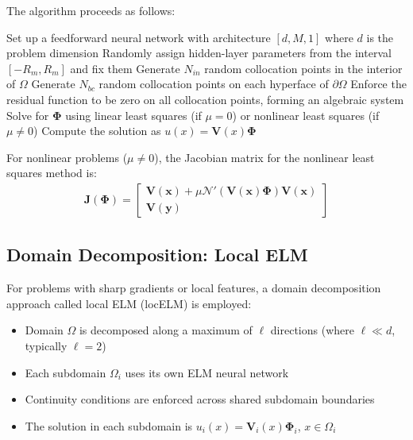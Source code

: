 \documentclass[11pt]{article}
\begin{document}
The algorithm proceeds as follows:

\begin{algorithm}
\caption{ELM Method for High-Dimensional PDEs}
\begin{algorithmic}[1]
\State Set up a feedforward neural network with architecture $[d, M, 1]$ where $d$ is the problem dimension
\State Randomly assign hidden-layer parameters from the interval $[-R_m, R_m]$ and fix them
\State Generate $N_{in}$ random collocation points in the interior of $\Omega$
\State Generate $N_{bc}$ random collocation points on each hyperface of $\partial\Omega$
\State Enforce the residual function to be zero on all collocation points, forming an algebraic system
\State Solve for $\mathbf{\Phi}$ using linear least squares (if $\mu=0$) or nonlinear least squares (if $\mu \neq 0$)
\State Compute the solution as $u(x) = \mathbf{V}(x)\mathbf{\Phi}$
\end{algorithmic}
\end{algorithm}

For nonlinear problems ($\mu \neq 0$), the Jacobian matrix for the nonlinear least squares method is:
\begin{align}
    \mathbf{J}(\mathbf{\Phi}) = \begin{bmatrix} \mathbf{V}(\mathbf{x}) + \mu\mathcal{N}'(\mathbf{V}(\mathbf{x})\mathbf{\Phi})\mathbf{V}(\mathbf{x}) \\ \mathbf{V}(\mathbf{y}) \end{bmatrix}
\end{align}

\subsection{Domain Decomposition: Local ELM}

For problems with sharp gradients or local features, a domain decomposition approach called local ELM (locELM) is employed:
\begin{itemize}
    \item Domain $\Omega$ is decomposed along a maximum of $\ell$ directions (where $\ell \ll d$, typically $\ell=2$)
    \item Each subdomain $\Omega_i$ uses its own ELM neural network
    \item Continuity conditions are enforced across shared subdomain boundaries
    \item The solution in each subdomain is $u_i(x) = \mathbf{V}_i(x)\mathbf{\Phi}_i$, $x \in \Omega_i$
\end{itemize}
\end{document}
